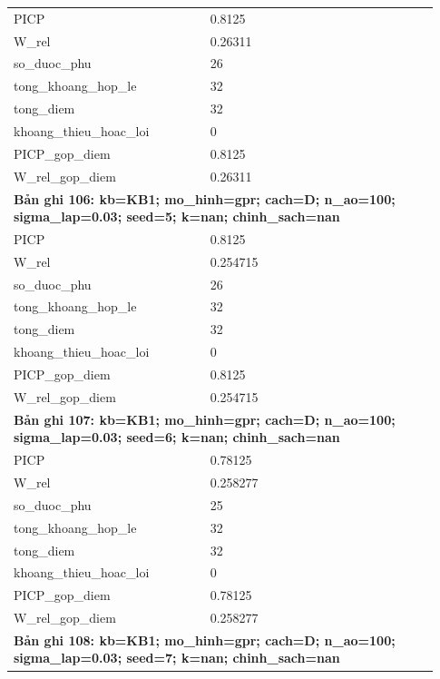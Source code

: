 \begin{longtable}{p{0.43\linewidth}p{0.50\linewidth}}
PICP & 0.8125 \\
W\_\allowbreak rel & 0.26311 \\
so\_\allowbreak duoc\_\allowbreak phu & 26 \\
tong\_\allowbreak khoang\_\allowbreak hop\_\allowbreak le & 32 \\
tong\_\allowbreak diem & 32 \\
khoang\_\allowbreak thieu\_\allowbreak hoac\_\allowbreak loi & 0 \\
PICP\_\allowbreak gop\_\allowbreak diem & 0.8125 \\
W\_\allowbreak rel\_\allowbreak gop\_\allowbreak diem & 0.26311 \\
\midrule
\multicolumn{2}{p{0.95\linewidth}}{\textbf{Bản ghi 106: kb=KB1; mo\_hinh=gpr; cach=D; n\_ao=100; sigma\_lap=0.03; seed=5; k=nan; chinh\_sach=nan}} \\
PICP & 0.8125 \\
W\_\allowbreak rel & 0.254715 \\
so\_\allowbreak duoc\_\allowbreak phu & 26 \\
tong\_\allowbreak khoang\_\allowbreak hop\_\allowbreak le & 32 \\
tong\_\allowbreak diem & 32 \\
khoang\_\allowbreak thieu\_\allowbreak hoac\_\allowbreak loi & 0 \\
PICP\_\allowbreak gop\_\allowbreak diem & 0.8125 \\
W\_\allowbreak rel\_\allowbreak gop\_\allowbreak diem & 0.254715 \\
\midrule
\multicolumn{2}{p{0.95\linewidth}}{\textbf{Bản ghi 107: kb=KB1; mo\_hinh=gpr; cach=D; n\_ao=100; sigma\_lap=0.03; seed=6; k=nan; chinh\_sach=nan}} \\
PICP & 0.78125 \\
W\_\allowbreak rel & 0.258277 \\
so\_\allowbreak duoc\_\allowbreak phu & 25 \\
tong\_\allowbreak khoang\_\allowbreak hop\_\allowbreak le & 32 \\
tong\_\allowbreak diem & 32 \\
khoang\_\allowbreak thieu\_\allowbreak hoac\_\allowbreak loi & 0 \\
PICP\_\allowbreak gop\_\allowbreak diem & 0.78125 \\
W\_\allowbreak rel\_\allowbreak gop\_\allowbreak diem & 0.258277 \\
\midrule
\multicolumn{2}{p{0.95\linewidth}}{\textbf{Bản ghi 108: kb=KB1; mo\_hinh=gpr; cach=D; n\_ao=100; sigma\_lap=0.03; seed=7; k=nan; chinh\_sach=nan}} \\

\end{longtable}
